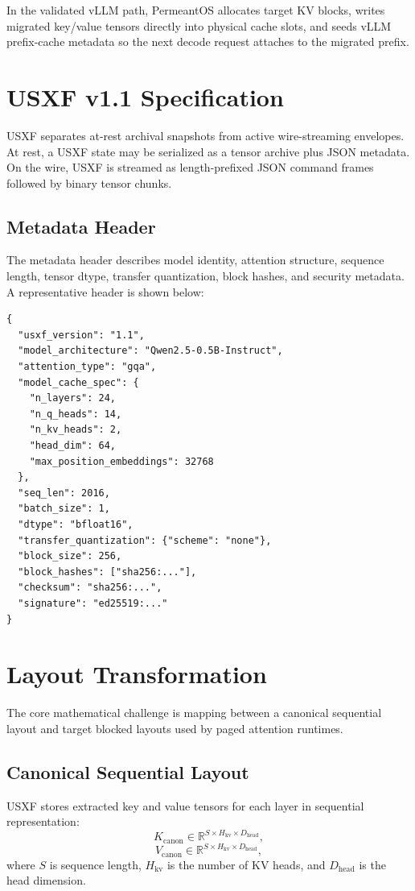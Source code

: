 \documentclass[11pt]{article}
\begin{document}
In the validated vLLM path, PermeantOS allocates target KV blocks, writes migrated key/value tensors directly into physical cache slots, and seeds vLLM prefix-cache metadata so the next decode request attaches to the migrated prefix.

\section{USXF v1.1 Specification}

USXF separates at-rest archival snapshots from active wire-streaming envelopes. At rest, a USXF state may be serialized as a tensor archive plus JSON metadata. On the wire, USXF is streamed as length-prefixed JSON command frames followed by binary tensor chunks.

\subsection{Metadata Header}

The metadata header describes model identity, attention structure, sequence length, tensor dtype, transfer quantization, block hashes, and security metadata. A representative header is shown below:

\begin{verbatim}
{
  "usxf_version": "1.1",
  "model_architecture": "Qwen2.5-0.5B-Instruct",
  "attention_type": "gqa",
  "model_cache_spec": {
    "n_layers": 24,
    "n_q_heads": 14,
    "n_kv_heads": 2,
    "head_dim": 64,
    "max_position_embeddings": 32768
  },
  "seq_len": 2016,
  "batch_size": 1,
  "dtype": "bfloat16",
  "transfer_quantization": {"scheme": "none"},
  "block_size": 256,
  "block_hashes": ["sha256:..."],
  "checksum": "sha256:...",
  "signature": "ed25519:..."
}
\end{verbatim}

\section{Layout Transformation}

The core mathematical challenge is mapping between a canonical sequential layout and target blocked layouts used by paged attention runtimes.

\subsection{Canonical Sequential Layout}

USXF stores extracted key and value tensors for each layer in sequential representation:
\begin{equation}
K_{\text{canon}} \in \mathbb{R}^{S \times H_{\text{kv}} \times D_{\text{head}}},
\end{equation}
\begin{equation}
V_{\text{canon}} \in \mathbb{R}^{S \times H_{\text{kv}} \times D_{\text{head}}},
\end{equation}
where $S$ is sequence length, $H_{\text{kv}}$ is the number of KV heads, and $D_{\text{head}}$ is the head dimension.
\end{document}
